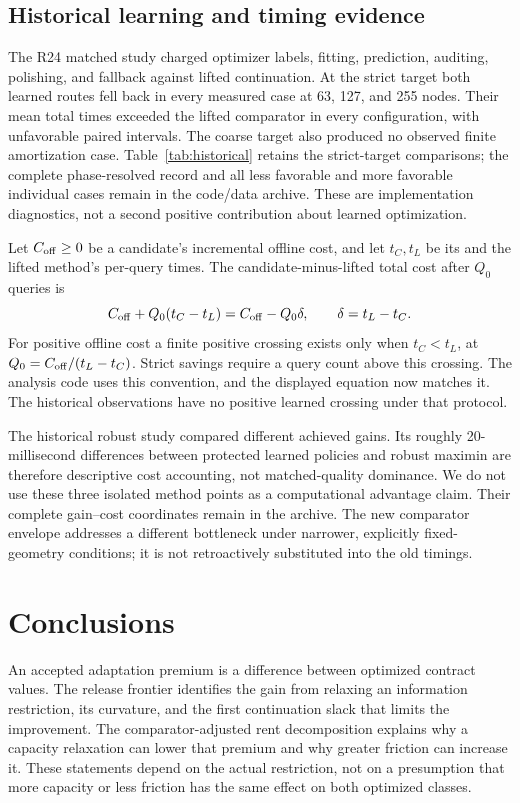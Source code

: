 \documentclass[11pt,letterpaper]{article}
\theoremstyle{definition}\newtheorem{assumption}[theorem]{Assumption}
\begin{document}
\subsection{Historical learning and timing evidence}
The R24 matched study charged optimizer labels, fitting, prediction, auditing, polishing, and fallback against lifted continuation. At the strict target both learned routes fell back in every measured case at 63, 127, and 255 nodes. Their mean total times exceeded the lifted comparator in every configuration, with unfavorable paired intervals. The coarse target also produced no observed finite amortization case. Table~\ref{tab:historical} retains the strict-target comparisons; the complete phase-resolved record and all less favorable and more favorable individual cases remain in the code/data archive. These are implementation diagnostics, not a second positive contribution about learned optimization.

Let $C_{\rm off}\geq0$ be a candidate's incremental offline cost, and let $t_C,t_L$ be its and the lifted method's per-query times. The candidate-minus-lifted total cost after $Q_0$ queries is
\begin{equation}\label{eq:amortization}
 C_{\rm off}+Q_0(t_C-t_L)=C_{\rm off}-Q_0\delta,
 \qquad \delta=t_L-t_C.
\end{equation}
For positive offline cost a finite positive crossing exists only when $t_C<t_L$, at $Q_0=C_{\rm off}/(t_L-t_C)$. Strict savings require a query count above this crossing. The analysis code uses this convention, and the displayed equation now matches it. The historical observations have no positive learned crossing under that protocol.


The historical robust study compared different achieved gains. Its roughly 20-millisecond differences between protected learned policies and robust maximin are therefore descriptive cost accounting, not matched-quality dominance. We do not use these three isolated method points as a computational advantage claim. Their complete gain--cost coordinates remain in the archive. The new comparator envelope addresses a different bottleneck under narrower, explicitly fixed-geometry conditions; it is not retroactively substituted into the old timings.

\section{Conclusions}
An accepted adaptation premium is a difference between optimized contract values. The release frontier identifies the gain from relaxing an information restriction, its curvature, and the first continuation slack that limits the improvement. The comparator-adjusted rent decomposition explains why a capacity relaxation can lower that premium and why greater friction can increase it. These statements depend on the actual restriction, not on a presumption that more capacity or less friction has the same effect on both optimized classes.
\end{document}
